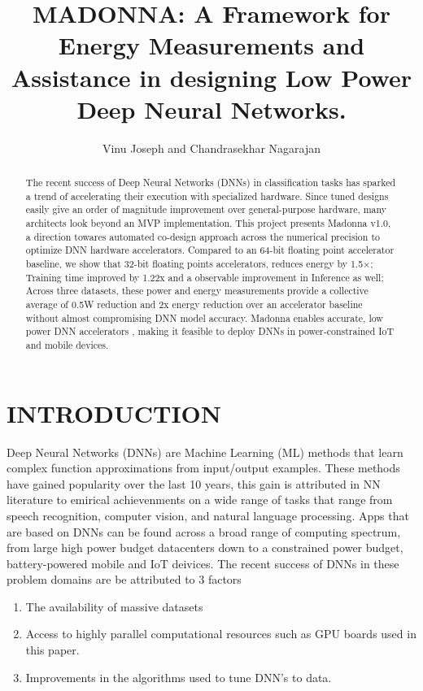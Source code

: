 \documentclass[letterpaper, 10 pt, conference]{ieeeconf}
\title{
\LARGE \textbf{MADONNA: A Framework for Energy Measurements and Assistance \newline in designing Low Power \textbf{D}eep \textbf{N}eural \textbf{N}etworks.
}}
\author{Vinu Joseph and Chandrasekhar Nagarajan}
\begin{document}
\maketitle
\thispagestyle{empty}
\pagestyle{empty}

\begin{abstract}

The recent success of Deep Neural Networks (DNNs) in
classification tasks has sparked a trend of accelerating their
execution with specialized hardware. 
Since tuned designs easily give an order of magnitude improvement over
general-purpose hardware, many architects look beyond an MVP implementation.
This project presents Madonna v1.0, a direction towares automated
co-design approach across the numerical precision 
to optimize DNN hardware accelerators.
Compared to an 64-bit floating point accelerator
baseline, we show that 32-bit floating points accelerators, reduces energy by 1.5×;
Training time improved by 1.22x and a observable improvement in Inference as well;
Across three datasets, these power and energy measurements provide a collective average
of 0.5W reduction and 2x energy reduction over an accelerator baseline
without almost compromising DNN model accuracy. 
Madonna enables accurate, low power DNN accelerators , making it feasible to deploy
DNNs in power-constrained IoT and mobile devices.  

\end{abstract}


\section{INTRODUCTION}
Deep Neural Networks (DNNs) are Machine Learning (ML) methods that learn
complex function approximations from input/output examples.
These methods have gained popularity over the last 10 years, this gain
is attributed in NN literature to emirical achievenments on a wide range
of tasks that range from speech recognition, computer vision, and natural language processing. Apps that are based on DNNs can be found across
a broad range of computing spectrum, from large high power budget datacenters
down to a constrained power budget, battery-powered mobile and IoT deivices.
The recent success of DNNs in these problem domains are be attributed to 3 factors
\begin{enumerate}
  \item The availability of massive datasets
  \item Access to highly parallel computational resources such as GPU boards used in this paper.
  \item Improvements in the algorithms used to tune DNN's to data.
\end{enumerate}
\end{document}
